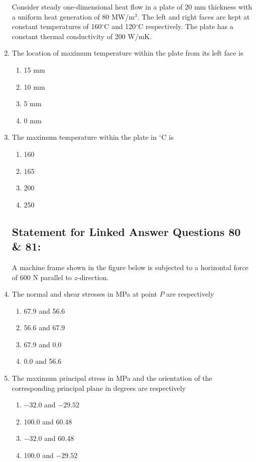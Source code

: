 \documentclass[journal,12pt,onecolumn]{IEEEtran}
\theoremstyle{remark}
\begin{document}
\begin{enumerate}
Consider steady one-dimensional heat flow in a plate of 20 mm thickness with a uniform heat generation of 80 MW/m$^3$. The left and right faces are kept at constant temperatures of 160$^\circ$C and 120$^\circ$C respectively. The plate has a constant thermal conductivity of 200 W/mK.

\item The location of maximum temperature within the plate from its left face is
    \begin{enumerate}
        \item 15 mm
        \item 10 mm
        \item 5 mm
        \item 0 mm
    \end{enumerate}
    
    \item The maximum temperature within the plate in $^\circ$C is
    \begin{enumerate}
        \item 160
        \item 165
        \item 200
        \item 250
    \end{enumerate}

\subsection{Statement for Linked Answer Questions 80 \& 81:}

A machine frame shown in the figure below is subjected to a horizontal force of 600 N parallel to $z$-direction.
\begin{center}

\end{center}
    \item The normal and shear stresses in MPa at point $P$ are respectively
    \begin{enumerate}
        \item 67.9 and 56.6
        \item 56.6 and 67.9
        \item 67.9 and 0.0
        \item 0.0 and 56.6
    \end{enumerate}

    \item The maximum principal stress in MPa and the orientation of the corresponding principal plane in degrees are respectively
    \begin{enumerate}
        \item $-32.0$ and $-29.52$
        \item 100.0 and 60.48
        \item $-32.0$ and 60.48
        \item 100.0 and $-29.52$
    \end{enumerate}


\end{enumerate}
\end{document}

